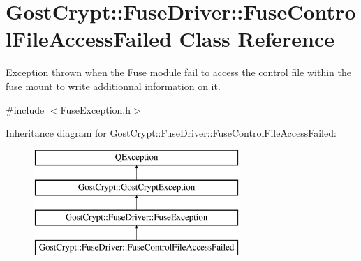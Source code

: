 \hypertarget{class_gost_crypt_1_1_fuse_driver_1_1_fuse_control_file_access_failed}{}\section{Gost\+Crypt\+:\+:Fuse\+Driver\+:\+:Fuse\+Control\+File\+Access\+Failed Class Reference}
\label{class_gost_crypt_1_1_fuse_driver_1_1_fuse_control_file_access_failed}


Exception thrown when the Fuse module fail to access the control file within the fuse mount to write additionnal information on it.  




{\ttfamily \#include $<$Fuse\+Exception.\+h$>$}

Inheritance diagram for Gost\+Crypt\+:\+:Fuse\+Driver\+:\+:Fuse\+Control\+File\+Access\+Failed\+:\begin{figure}[H]
\begin{center}
\leavevmode
\includegraphics[height=4.000000cm]{class_gost_crypt_1_1_fuse_driver_1_1_fuse_control_file_access_failed}
\end{center}
\end{figure}
